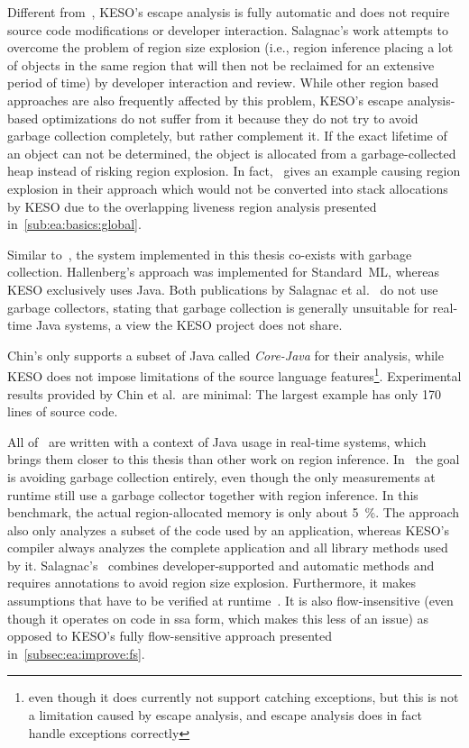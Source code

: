 	Different from~\cite{grossman:02:pldi, salagnac:07:rtcsa}, KESO's escape analysis is fully automatic and does not
	require source code modifications or developer interaction. Salagnac's work attempts to overcome the problem of region
	size explosion (i.e., region inference placing a lot of objects in the same region that will then not be reclaimed for
	an extensive period of time) by developer interaction and review. While other region based approaches are also
	frequently affected by this problem, KESO's escape analysis-based optimizations do not suffer from it because they do
	not try to avoid garbage collection completely, but rather complement it. If the exact lifetime of an object can not
	be determined, the object is allocated from a garbage-collected heap instead of risking region explosion. In
	fact,~\cite{salagnac:07:rtcsa} gives an example causing region explosion in their approach which would not be
	converted into stack allocations by KESO due to the overlapping liveness region analysis presented
	in~\cref{sub:ea:basics:global}.

	Similar to~\cite{hallenberg:02:sigplan}, the system implemented in this thesis co-exists with garbage collection.
	Hallenberg's approach was implemented for Standard~ML, whereas KESO exclusively uses Java. Both publications by
	Salagnac et al.~\cite{salagnac:05:aiool, salagnac:07:rtcsa} do not use garbage collectors, stating that garbage
	collection is generally unsuitable for real-time Java systems, a view the KESO project does not share.

	Chin's \cite{chin:04:pldi} only supports a subset of Java called \emph{Core-Java} for their analysis, while KESO does
	not impose limitations of the source language features\footnote{even though it does currently not support catching
	exceptions, but this is not a limitation caused by escape analysis, and escape analysis does in fact handle exceptions
	correctly}. Experimental results provided by Chin et al.\ are minimal: The largest example has only 170 lines of
	source code.

	All of~\cite{chin:04:pldi, salagnac:05:aiool, salagnac:07:rtcsa} are written with a context of Java usage in real-time
	systems, which brings them closer to this thesis than other work on region inference. In~\cite{salagnac:05:aiool} the
	goal is avoiding garbage collection entirely, even though the only measurements at runtime still use a garbage
	collector together with region inference. In this benchmark, the actual region-allocated memory is only about 5~\%.
	The approach also only analyzes a subset of the code used by an application, whereas KESO's compiler always analyzes
	the complete application and all library methods used by it. Salagnac's~\cite{salagnac:07:rtcsa} combines
	developer-supported and automatic methods and requires annotations to avoid region size explosion. Furthermore, it
	makes assumptions that have to be verified at runtime~\cite[Sec.~3.1]{salagnac:07:rtcsa}. It is also flow-insensitive
	(even though it operates on code in \gls{ssa} form, which makes this less of an issue) as opposed to KESO's fully
	flow-sensitive approach presented in~\cref{subsec:ea:improve:fs}.
